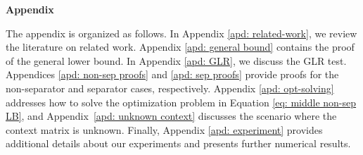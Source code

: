 \begin{center} \label{sec: apd}
    {\Large \textbf{Appendix}}
\end{center}

The appendix is organized as follows. In Appendix \ref{apd: related-work}, we review the literature on related work. Appendix \ref{apd: general bound} contains the proof of the general lower bound. In Appendix \ref{apd: GLR}, we discuss the GLR test. Appendices \ref{apd: non-sep proofs} and \ref{apd: sep proofs} provide proofs for the non-separator and separator cases, respectively. Appendix \ref{apd: opt-solving} addresses how to solve the optimization problem in Equation \eqref{eq: middle non-sep LB}, and Appendix~\ref{apd: unknown context} discusses the scenario where the context matrix is unknown. Finally, Appendix \ref{apd: experiment} provides additional details about our experiments and presents further numerical results.


